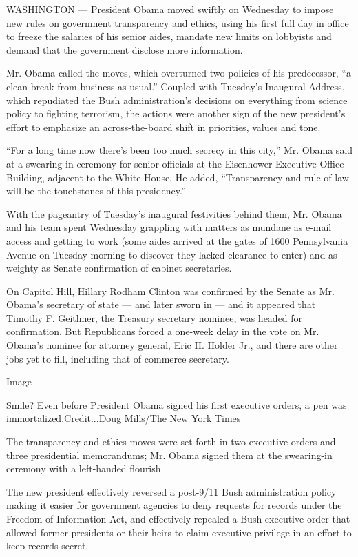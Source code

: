 WASHINGTON --- President Obama moved swiftly on Wednesday to impose new
rules on government transparency and ethics, using his first full day in
office to freeze the salaries of his senior aides, mandate new limits on
lobbyists and demand that the government disclose more information.

Mr. Obama called the moves, which overturned two policies of his
predecessor, ``a clean break from business as usual.'' Coupled with
Tuesday's Inaugural Address, which repudiated the Bush administration's
decisions on everything from science policy to fighting terrorism, the
actions were another sign of the new president's effort to emphasize an
across-the-board shift in priorities, values and tone.

``For a long time now there's been too much secrecy in this city,'' Mr.
Obama said at a swearing-in ceremony for senior officials at the
Eisenhower Executive Office Building, adjacent to the White House. He
added, ``Transparency and rule of law will be the touchstones of this
presidency.''

With the pageantry of Tuesday's inaugural festivities behind them, Mr.
Obama and his team spent Wednesday grappling with matters as mundane as
e-mail access and getting to work (some aides arrived at the gates of
1600 Pennsylvania Avenue on Tuesday morning to discover they lacked
clearance to enter) and as weighty as Senate confirmation of cabinet
secretaries.

On Capitol Hill, Hillary Rodham Clinton was confirmed by the Senate as
Mr. Obama's secretary of state --- and later sworn in --- and it
appeared that Timothy F. Geithner, the Treasury secretary nominee, was
headed for confirmation. But Republicans forced a one-week delay in the
vote on Mr. Obama's nominee for attorney general, Eric H. Holder Jr.,
and there are other jobs yet to fill, including that of commerce
secretary.

Image

Smile? Even before President Obama signed his first executive orders, a
pen was immortalized.Credit...Doug Mills/The New York Times

The transparency and ethics moves were set forth in two executive orders
and three presidential memorandums; Mr. Obama signed them at the
swearing-in ceremony with a left-handed flourish.

The new president effectively reversed a post-9/11 Bush administration
policy making it easier for government agencies to deny requests for
records under the Freedom of Information Act, and effectively repealed a
Bush executive order that allowed former presidents or their heirs to
claim executive privilege in an effort to keep records secret.

